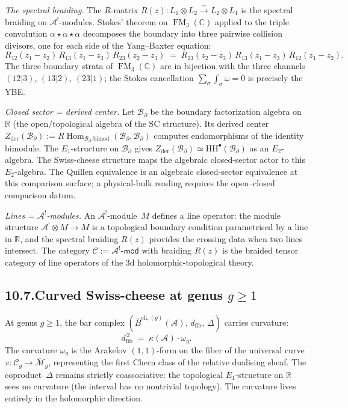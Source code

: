 \documentclass[11pt]{report}
\theoremstyle{definition}
\theoremstyle{remark}
\providecommand{\cA}{\mathcal{A}}
\providecommand{\cB}{\mathcal{B}}
\providecommand{\cC}{\mathcal{C}}
\providecommand{\cM}{\mathcal{M}}
\numberwithin{equation}{section}
\begin{document}
\medskip
\noindent\emph{The spectral braiding.}
The $R$-matrix $R(z)\colon L_1\otimes L_2\xrightarrow{\sim}
L_2\otimes L_1$ is the spectral braiding on $\cA^!$-modules.
Stokes' theorem on $\operatorname{FM}_3(\mathbb C)$ applied to
the triple convolution $\alpha\star\alpha\star\alpha$ decomposes
the boundary into three pairwise collision divisors, one for
each side of the Yang--Baxter equation:
\[
R_{12}(z_1{-}z_2)\,R_{13}(z_1{-}z_3)\,R_{23}(z_2{-}z_3)
\;=\;
R_{23}(z_2{-}z_3)\,R_{13}(z_1{-}z_3)\,R_{12}(z_1{-}z_2).
\]
The three boundary strata of $\operatorname{FM}_3(\mathbb C)$ are
in bijection with the three channels $(12|3)$, $(13|2)$,
$(23|1)$; the Stokes cancellation
$\sum_{\sigma}\int_{\sigma}\omega=0$ is precisely the YBE.

\medskip
\noindent\emph{Closed sector = derived center.}
Let $\cB_\partial$ be the boundary factorization algebra on
$\mathbb R$ (the open/topological algebra of the SC structure).
Its derived center
$Z_{\mathrm{der}}(\cB_\partial)
:=R\operatorname{Hom}_{\cB_\partial\text{-}\mathrm{bimod}}
(\cB_\partial,\cB_\partial)$
computes endomorphisms of the identity bimodule. The $E_1$-structure
on $\cB_\partial$ gives
$Z_{\mathrm{der}}(\cB_\partial)\simeq\mathrm{HH}^\bullet(\cB_\partial)$
as an $E_2$-algebra. The Swiss-cheese structure maps the algebraic
closed-sector actor to this $E_2$-algebra. The Quillen equivalence is
an algebraic closed-sector equivalence at this comparison surface; a
physical-bulk reading requires the open--closed comparison datum.

\medskip
\noindent\emph{Lines = $\cA^!$-modules.}
An $\cA^!$-module~$M$ defines a line operator: the module
structure $\cA^!\otimes M\to M$ is a topological boundary
condition parametrised by a line in $\mathbb R$, and the spectral
braiding $R(z)$ provides the crossing data when two lines
intersect. The category $\cC:=\cA^!\text{-}\mathsf{mod}$ with
braiding $R(z)$ is the braided tensor category of line operators
of the 3d holomorphic-topological theory.

\subsection*{10.7.\enspace Curved Swiss-cheese at genus $g\ge 1$}

At genus $g\ge 1$, the bar complex
$(\bar B^{\mathrm{ch},(g)}(\cA),\,d_{\mathrm{fib}},\,\Delta)$
carries curvature:
\[
d_{\mathrm{fib}}^{\,2}\;=\;\kappa(\cA)\cdot\omega_g.
\]
The curvature $\omega_g$ is the Arakelov $(1,1)$-form on the fiber
of the universal curve $\pi\colon\cC_g\to\overline{\cM}_g$,
representing the first Chern class of the relative dualising sheaf.
The coproduct~$\Delta$ remains strictly coassociative: the
topological $E_1$-structure on $\mathbb R$ sees no curvature
(the interval has no nontrivial topology). The curvature lives
entirely in the holomorphic direction.
\end{document}

